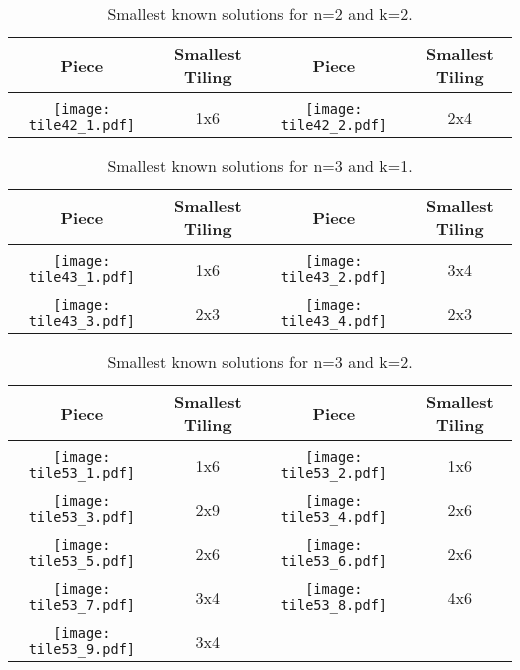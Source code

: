 \documentclass[10pt,a4paper]{article}
\theoremstyle{definition}
\begin{document}
\begin{table}[!htpb]
\centering
\begin{tabular}{|c|c|c|c|}
\hline
Piece & Smallest Tiling & Piece & Smallest Tiling\\ \hline
& & & \\ 
\texttt{[image: tile42\_1.pdf]} & 1x6 & \texttt{[image: tile42\_2.pdf]} & 2x4 \\ \hline
\end{tabular}
\caption{Smallest known solutions for n=2 and k=2.}
\label{tab:trivial-22}
\end{table}

\begin{table}[!htpb]
\centering
\begin{tabular}{|c|c|c|c|}
\hline
Piece & Smallest Tiling & Piece & Smallest Tiling\\ \hline
& & & \\ 
\texttt{[image: tile43\_1.pdf]} & 1x6 & \texttt{[image: tile43\_2.pdf]} & 3x4 \\ \hline
& & & \\ 
\texttt{[image: tile43\_3.pdf]} & 2x3 & \texttt{[image: tile43\_4.pdf]} & 2x3 \\ \hline
\end{tabular}
\caption{Smallest known solutions for n=3 and k=1.}
\label{tab:trivial-31}
\end{table}

\begin{table}[!htpb]
\centering
\begin{tabular}{|c|c|c|c|}
\hline
Piece & Smallest Tiling & Piece & Smallest Tiling\\ \hline
& & & \\ 
\texttt{[image: tile53\_1.pdf]} & 1x6 & \texttt{[image: tile53\_2.pdf]} & 1x6 \\ \hline
& & & \\ 
\texttt{[image: tile53\_3.pdf]} & 2x9 & \texttt{[image: tile53\_4.pdf]} & 2x6 \\ \hline
& & & \\ 
\texttt{[image: tile53\_5.pdf]} & 2x6 & \texttt{[image: tile53\_6.pdf]} & 2x6 \\ \hline
& & & \\ 
\texttt{[image: tile53\_7.pdf]} & 3x4 & \texttt{[image: tile53\_8.pdf]} & 4x6 \\ \hline
& & & \\ 
\texttt{[image: tile53\_9.pdf]} & 3x4  & & \\ \hline
\end{tabular}
\caption{Smallest known solutions for n=3 and k=2.}
\label{tab:trivial-32}
\end{table}
\end{document}
